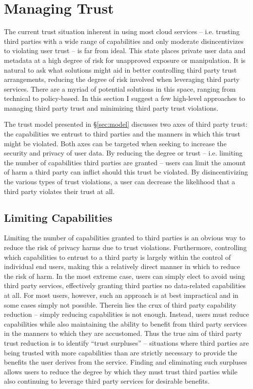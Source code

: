 \section{Managing Trust}
\label{sec:mitigation}

The current trust situation inherent in using most cloud services --
i.e. trusting third parties with a wide range of capabilities and only
moderate disincentivizes to violating user trust -- is far from
ideal. This state places private user data and metadata at a high
degree of risk for unapproved exposure or manipulation. It is natural
to ask what solutions might aid in better controlling third party
trust arrangements, reducing the degree of risk involved when
leveraging third party services. There are a myriad of potential
solutions in this space, ranging from technical to policy-based. In
this section I suggest a few high-level approaches to managing third
party trust and minimizing third party trust violations.

The trust model presented in \S\ref{sec:model} discusses two axes of
third party trust: the capabilities we entrust to third parties and
the manners in which this trust might be violated. Both axes can be
targeted when seeking to increase the security and privacy of user
data. By reducing the degree or trust -- i.e. limiting the number of
capabilities third parties are granted -- users can limit the amount
of harm a third party can inflict should this trust be violated. By
disincentivizing the various types of trust violations, a user can
decrease the likelihood that a third party violates their trust at
all.

\subsection{Limiting Capabilities}
\label{sec:mitigation:capabilities}

Limiting the number of capabilities granted to third parties is an
obvious way to reduce the risk of privacy harms due to trust
violations. Furthermore, controlling which capabilities to entrust to
a third party is largely within the control of individual end users,
making this a relatively direct manner in which to reduce the risk of
harm. In the most extreme case, users can simply elect to avoid using
third party services, effectively granting third parties no
data-related capabilities at all. For most users, however, such an
approach is at best impractical and in some cases simply not
possible. Therein lies the crux of third party capability reduction --
simply reducing capabilities is not enough. Instead, users must reduce
capabilities while also maintaining the ability to benefit from third
party services in the manners to which they are accustomed. Thus the
true aim of third party trust reduction is to identify ``trust
surpluses'' -- situations where third parties are being trusted with
more capabilities than are strictly necessary to provide the benefits
the user derives from the service. Finding and eliminating such
surpluses allows users to reduce the degree by which they must trust
third parties while also continuing to leverage third party services
for desirable benefits.

